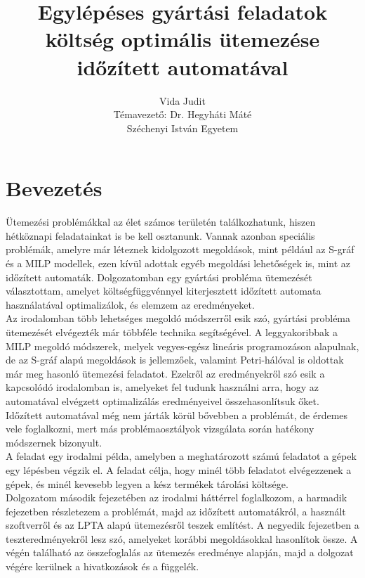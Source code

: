 \documentclass {report}
\begin{document}
\title{Egylépéses gyártási feladatok költség optimális ütemezése időzített automatával}

\author{Vida Judit\\Témavezető: Dr. Hegyháti Máté\\Széchenyi István Egyetem}
\maketitle


\tableofcontents
\chapter{Bevezetés}
Ütemezési problémákkal az élet számos területén találkozhatunk, hiszen hétköznapi feladatainkat is be kell osztanunk. Vannak azonban speciális problémák, amelyre már léteznek kidolgozott megoldások, mint például az S-gráf és a MILP modellek, ezen kívül adottak egyéb megoldási lehetőségek is, mint az időzített automaták. Dolgozatomban egy gyártási probléma ütemezését választottam, amelyet költségfüggvénnyel kiterjesztett időzített automata használatával optimalizálok, és elemzem az eredményeket.\\
Az irodalomban több lehetséges megoldó módszerről esik szó, gyártási probléma ütemezését elvégezték már többféle technika segítségével. A leggyakoribbak a MILP megoldó módszerek, melyek vegyes-egész lineáris programozáson alapulnak, de az S-gráf alapú megoldások is jellemzőek, valamint Petri-hálóval is oldottak már meg hasonló ütemezési feladatot. Ezekről az eredményekről szó esik a kapcsolódó irodalomban is, amelyeket fel tudunk használni arra, hogy az automatával elvégzett optimalizálás eredményeivel összehasonlítsuk őket. \\
Időzített automatával még nem járták körül bővebben a problémát, de érdemes vele foglalkozni, mert más problémaosztályok vizsgálata során hatékony módszernek bizonyult.\\
A feladat egy irodalmi példa, amelyben a meghatározott számú feladatot a gépek egy lépésben végzik el.
A feladat célja, hogy minél több feladatot elvégezzenek a gépek, és minél kevesebb legyen a kész termékek tárolási költsége.\\
Dolgozatom második fejezetében az irodalmi háttérrel foglalkozom, a harmadik fejezetben részletezem a problémát, majd az időzített automatákról, a használt szoftverről és az LPTA alapú ütemezésről teszek említést. A negyedik fejezetben a teszteredményekről lesz szó, amelyeket korábbi megoldásokkal hasonlítok össze. A végén található az összefoglalás az ütemezés eredménye alapján, majd a dolgozat végére kerülnek a hivatkozások és a függelék. 
\end{document}
